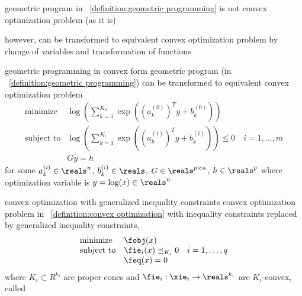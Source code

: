 \documentclass[17pt,landscape]{foils}
\begin{document}
{

\bit
\item
	geometric program in
	~\ref{definition:geometric programming}
	is not convex optimization problem (as it is)
\item
	however, can be transformed to equivalent convex optimization problem
	by change of variables and transformation of functions
\eit

\begin{myproposition}{geometric programming in convex form}
	geometric program (in ~\ref{definition:geometric programming})
	can be transformed to equivalent convex optimization problem
		$$
			\begin{array}{ll}
				\mbox{minimize} &
					\log\left(
					\sum_{k=1}^{K_0} \exp((a^{(0)}_k)^T y + b^{(0)}_k)
					\right)
				\\
				\mbox{subject to} &
					\log\left(
					\sum_{k=1}^{K_i} \exp((a^{(i)}_k)^T y + b^{(i)}_k)
					\right)
					\leq0
					\quad
					i=1,\ldots,m
				\\ &
					Gy = h
			\end{array}
		$$
	for some $a^{(i)}_k\in\reals^n$, $b^{(i)}_k\in\reals$, $G\in\reals^{p\times n}$, $h\in\reals^p$
	where optimization variable is $y=\log(x)\in\reals^n$
\end{myproposition}



\begin{mydefinition}{convex optimization with generalized inequality constraints}
	convex optimization problem in ~\ref{definition:convex optimization}
	with inequality constraints replaced by generalized inequality constraints,
	\ie
	$$
		\begin{array}{ll}
			\mbox{minimize}
				& \fobj(x)
			\\
			\mbox{subject to}
				& \fie_i(x) \preceq_{K_i} 0\quad i=1,\ldots,q
			\\
				& \feq(x) = 0
		\end{array}
	$$
	where
	$K_i\subset R^{k_i}$ are proper cones
	and
	$\fie_i:\xie_i\to\reals^{k_i}$ are $K_i$-convex,
	called 
\end{mydefinition}

}
\end{document}
